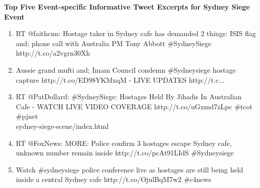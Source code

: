 \textbf{Top Five Event-specific Informative Tweet Excerpts for Sydney Siege Event}
\begin{enumerate}
\item RT @faithcnn: Hostage taker in Sydney cafe has demanded 2 things: ISIS flag and; phone call with Australia PM Tony Abbott \#SydneySiege http://t.co/a2vgrn30Xh
\item Aussie grand mufti and; Imam Council condemn \#Sydneysiege hostage capture http://t.co/ED98YKMxqM - LIVE UPDATES http://t.c...
\item RT @PatDollard: \#SydneySiege: Hostages Held By Jihadis In Australian Cafe - WATCH LIVE VIDEO COVERAGE http://t.co/uGxmd7zLpc \#tcot \#pjnet \\ sydney-siege-scene/index.html
\item RT @FoxNews: MORE: Police confirm 3 hostages escape Sydney cafe, unknown number remain inside http://t.co/pcAt91LIdS \#Sydneysiege
\item Watch \#sydneysiege police conference live as hostages are still being held inside a central Sydney cafe http://t.co/OjulBqM7w2 \#c4news
\end{enumerate}


